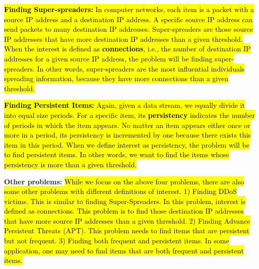 \hl{\noindent\textbf{Finding Super-spreaders:}
In computer networks, each item is a packet with a source IP address and a destination IP address. A specific source IP address can send packets to many destination IP addresses. Super-spreaders are those source IP addresses that have more destination IP addresses than a given threshold. When the interest is defined as \textbf{connections}, i.e., the number of destination IP addresses for a given source IP address, the problem will be finding super-spreaders. In other words, super-spreaders are the most influential individuals spreading information, because they have more connections than a given threshold. }


\noindent\hl{\textbf{Finding Persistent Items:}
Again, given a data stream, we equally divide it into equal size periods. For a specific item, its \textbf{persistency} indicates the number of periods in which the item appears. 
No matter an item appears either once or more in a period, its persistency is incremented by one because there exists this item in this period. When we define interest as persistency, the problem will be to find persistent items. In other words, we want to find the items whose persistency is more than a given threshold.
}



\noindent\textcolor{reviewA}{\textbf{Other problems:} \hl{While we focus on the above four problems, there are also some other problems with different definitions of interest.
1) Finding DDoS victims. This is similar to finding Super-Spreaders. In this problem, interest is defined as connections. This problem is to find those destination IP addresses that have more source IP addresses than a given threshold. 
2) Finding Advance Persistent Threats (APT). This problem needs to find items that are persistent but not frequent.
3) Finding both frequent and persistent items. In some application, one may need to find items that are both frequent and persistent items.} }







\begin{comment}
\ppp{Finding Super-spreaders:}
In computer networks, each item is a packet with a source IP address and a destination IP address. A specific source IP address can send packets to many destination IP addresses. When the interest is defined as \textbf{connections}, i.e., the number of destination IP addresses for a given source IP address, the problem will be about finding super-spreaders.


\ppp{Finding Persistent Items:}
Again, given a data stream, we equally divide it into equal size periods. 
%
For a specific item, its \textbf{persistency} indicates the number of periods in which the item appears. 
%
In each period, if an item appears, either once or more, its persistency is incremented by one. 
%
When we define interest as persistency, the problem will be to find persistent items.
\end{comment}